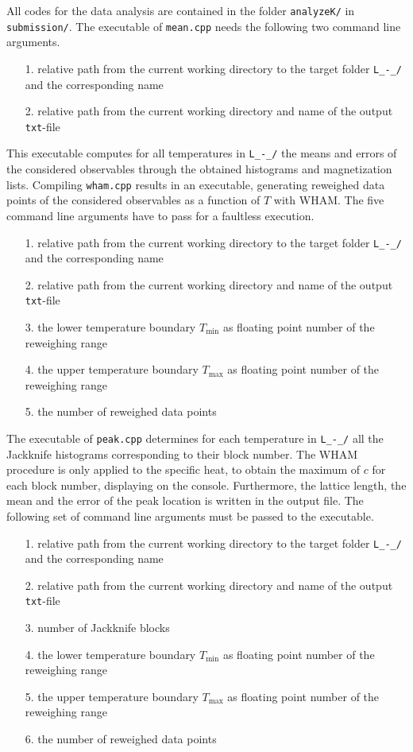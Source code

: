 All codes for the data analysis are contained in the folder \verb|analyzeK/| in \verb|submission/|. The executable of \verb|mean.cpp| needs 
the following two command line arguments.
\begin{itemize}
  \item[1.] relative path from the current working directory to the target folder \verb|L_-_/| and the corresponding name
  \item[2.] relative path from the current working directory and name of the output \verb|txt|-file
\end{itemize}
This executable computes for all temperatures in \verb|L_-_/| the means and errors of the considered observables through the obtained histograms 
and magnetization lists. Compiling \verb|wham.cpp| results in an executable, generating reweighed data points of the considered 
observables as a function of $T$ with WHAM. The five command line arguments have to pass for a faultless execution.
\begin{itemize}
  \item[1.] relative path from the current working directory to the target folder \verb|L_-_/| and the corresponding name
  \item[2.] relative path from the current working directory and name of the output \verb|txt|-file
  \item[3.] the lower temperature boundary $T_\mathrm{min}$ as floating point number of the reweighing range
  \item[4.] the upper temperature boundary $T_\mathrm{max}$ as floating point number of the reweighing range
  \item[5.] the number of reweighed data points
\end{itemize}
The executable of \verb|peak.cpp| determines for each temperature in \verb|L_-_/| all the Jackknife histograms corresponding
to their block number. The WHAM procedure is only applied to the specific heat, to obtain the maximum of $c$ for each block number, displaying on
the console. Furthermore, the lattice length, the mean and the error of the peak location is written in the output file.
The following set of command line arguments must be passed to the executable.
\begin{itemize}
  \item[1.] relative path from the current working directory to the target folder \verb|L_-_/| and the corresponding name
  \item[2.] relative path from the current working directory and name of the output \verb|txt|-file
  \item[3.] number of Jackknife blocks
  \item[4.] the lower temperature boundary $T_\mathrm{min}$ as floating point number of the reweighing range
  \item[5.] the upper temperature boundary $T_\mathrm{max}$ as floating point number of the reweighing range
  \item[6.] the number of reweighed data points
\end{itemize}

